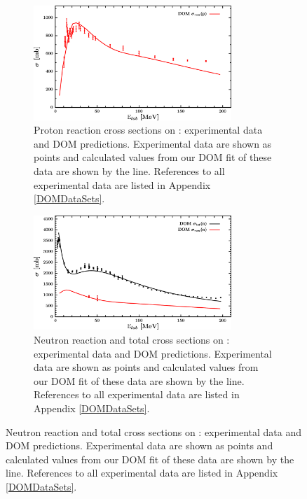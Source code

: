 \begin{figure}[tb]
    \centering
    \begin{subfigure}[c]{\textwidth}
        \centering
        \includegraphics[width=0.82\textwidth]{figures/ca40_protonInelastic.png}
        \caption[Proton \rxn\ of \caForty: DOM predictions and experimental data]
        {
            Proton reaction cross sections on \caForty: experimental data and
            DOM predictions. Experimental data are shown as points and 
            calculated values from our DOM fit of these data are shown
            by the line. References to all experimental
            data are listed in Appendix \ref{DOMDataSets}.
        }
        \label{Ca40ProtonInelastic}
    \end{subfigure}\vspace{16pt}
    \begin{subfigure}[c]{\textwidth}
        \centering
        \includegraphics[width=0.82\textwidth]{figures/ca40_neutronInelastic.png}
        \caption[Neutron \rxn\ and \tot\ of \caForty: DOM predictions and experimental data]
        {
            Neutron reaction and total cross sections on \caForty: experimental data and
            DOM predictions. Experimental data are shown as points and 
            calculated values from our DOM fit of these data are shown
            by the line. References to all experimental
            data are listed in Appendix \ref{DOMDataSets}.
        }
        \label{Ca40NeutronInelastic}
    \end{subfigure}
\end{figure}

